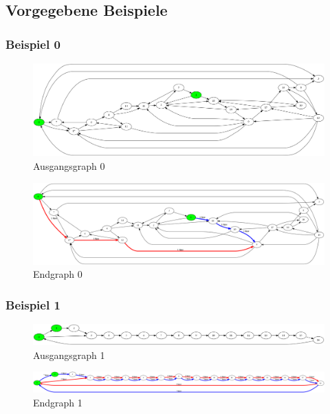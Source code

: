 \documentclass[a4paper,10pt,ngerman]{scrartcl}
\begin{document}
    \subsection{Vorgegebene Beispiele}

      \subsubsection{Beispiel 0}
        \begin{figure}[H]
          \centering
          \includegraphics[width=15cm]{../beispielausgaben/huepfburg0.png}
          \caption{Ausgangsgraph 0}
          \label{fig:Ausgangsgraph0}
        \end{figure}
        
        \begin{figure}[H]
          \centering
          \includegraphics[width=15cm]{../beispielausgaben/huepfburg0_end.png}
          \caption{Endgraph 0}
          \label{fig:Endgraph0}
        \end{figure}

      
      \subsubsection{Beispiel 1}
        \begin{figure}[H]
          \centering
          \includegraphics[width=15cm]{../beispielausgaben/huepfburg1.png}
          \caption{Ausgangsgraph 1}
          \label{fig:Ausgangsgraph1}
        \end{figure}
        
        \begin{figure}[H]
          \centering
          \includegraphics[width=15cm]{../beispielausgaben/huepfburg1_end.png}
          \caption{Endgraph 1}
          \label{fig:Endgraph1}
        \end{figure}
\end{document}
